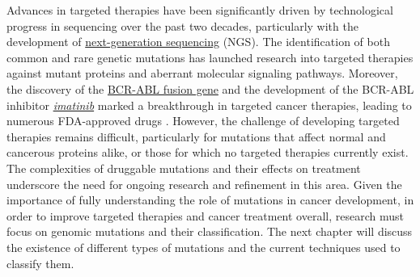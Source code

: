 Advances in targeted therapies have been significantly driven by technological progress in sequencing over the past two decades, particularly with the development of \href{https://en.wikipedia.org/wiki/Massive_parallel_sequencing}{next-generation sequencing} (NGS). The identification of both common and rare genetic mutations has launched research into targeted therapies against mutant proteins and aberrant molecular signaling pathways. Moreover, the discovery of the \href{https://en.wikipedia.org/wiki/Philadelphia_chromosome}{BCR-ABL fusion gene} and the development of the BCR-ABL inhibitor \href{https://en.wikipedia.org/wiki/Imatinib}{\textit{imatinib}} marked a breakthrough in targeted cancer therapies, leading to numerous FDA-approved drugs \cite{jci}. However, the challenge of developing targeted therapies remains difficult, particularly for mutations that affect normal and cancerous proteins alike, or those for which no targeted therapies currently exist. The complexities of druggable mutations and their effects on treatment underscore the need for ongoing research and refinement in this area. Given the importance of fully understanding the role of mutations in cancer development, in order to improve targeted therapies and cancer treatment overall, research must focus on genomic mutations and their classification. The next chapter will discuss the existence of different types of mutations and the current techniques used to classify them.

\cleardoublepage
